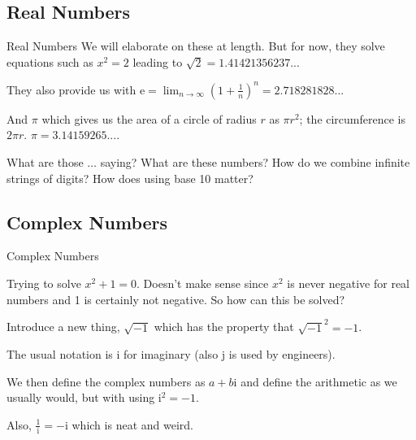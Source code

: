 \documentclass{beamer}
\begin{document}
\subsection{Real Numbers}

\begin{frame}{Real Numbers}
    We will elaborate on these at length. But for now, they solve equations such as $x^2 = 2$ leading to $\sqrt{2} = 1.41421356237...$

    They also provide us with $\mathrm{e} = \lim_{n \to \infty} (1+\frac{1}{n})^n  = 2.718281828...$

    And $\pi$ which gives us the area of a circle of radius $r$ as $\pi r^2$; the circumference is $2 \pi r$. $\pi = 3.14159265....$

    What are those $\ldots$ saying?  What are these numbers? How do we combine infinite strings of digits? How does using base 10 matter? 
    
\end{frame}

\subsection{Complex Numbers}

\begin{frame}{Complex Numbers}

Trying to solve $x^2 + 1 = 0$. Doesn't make sense since $x^2$ is never negative for real numbers and 1 is certainly not negative. So how can this be solved? 

Introduce a new thing, $\sqrt{-1}$ which has the property that $\sqrt{-1}^2 = -1$. 

The usual notation is $\mathrm{i}$ for imaginary (also $\mathrm{j}$ is used by engineers).

We then define the complex numbers as $a + b \mathrm{i}$ and define the arithmetic as we usually would, but with using $\mathrm{i}^2 = -1$. 

Also, $\frac{1}{\mathrm{i}} = - \mathrm{i}$ which is neat and weird. 

\end{frame}
\end{document}
